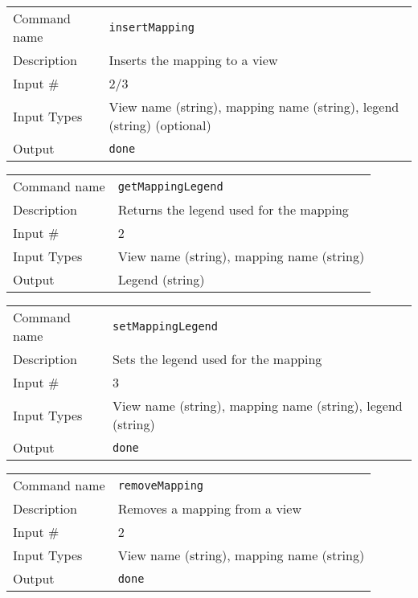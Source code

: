 \bigskip

\noindent
\begin{tabular}{l|p{5in}}
\hline
Command name & {\tt insertMapping} \\
Description  & Inserts the mapping to a view \\
Input \#     & 2/3 \\
Input Types  & View name (string), mapping name (string), legend (string)
               (optional) \\
Output       & {\tt done} \\
\hline
\end{tabular}

\bigskip

\noindent
\begin{tabular}{l|p{5in}}
\hline
Command name & {\tt getMappingLegend} \\
Description  & Returns the legend used for the mapping \\
Input \#     & 2 \\
Input Types  & View name (string), mapping name (string) \\
Output       & Legend (string) \\
\hline
\end{tabular}

\bigskip

\noindent
\begin{tabular}{l|p{5in}}
\hline
Command name & {\tt setMappingLegend} \\
Description  & Sets the legend used for the mapping \\
Input \#     & 3 \\
Input Types  & View name (string), mapping name (string), legend (string) \\
Output       & {\tt done} \\
\hline
\end{tabular}

\bigskip

\noindent
\begin{tabular}{l|p{5in}}
\hline
Command name & {\tt removeMapping} \\
Description  & Removes a mapping from a view \\
Input \#     & 2 \\
Input Types  & View name (string), mapping name (string) \\
Output       & {\tt done} \\
\hline
\end{tabular}

